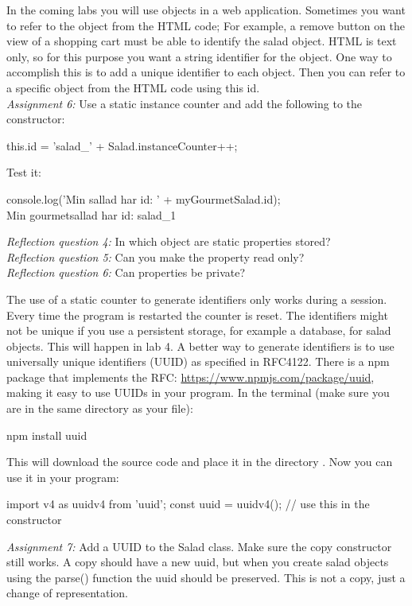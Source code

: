 \documentclass[fleqn, article, a4paper]{memoir}
\begin{document}
\begin{Assignments}
\item In the coming labs you will use  objects in a web application. Sometimes you want to refer to the object from the HTML code; For example, a remove button on the view of a shopping cart must be able to identify the salad object. HTML is text only, so for this purpose you want a string identifier for the object. One way to accomplish this is to add a unique identifier to each  object. Then you can refer to a specific object from the HTML code using this id.
\\\emph{Assignment 6:}
Use a static instance counter and add the following to the  constructor:
\begin{Code}
this.id = 'salad_' + Salad.instanceCounter++;
\end{Code}
Test it:
\begin{Code}
console.log('Min sallad har id: ' + myGourmetSalad.id);
\\ Min gourmetsallad har id: salad_1
\end{Code}
\emph{Reflection question 4:} In which object are static properties stored?
\\\emph{Reflection question 5:} Can you make the  property read only?
\\\emph{Reflection question 6:} Can properties be private?

\item
The use of a static counter to generate identifiers only works during a session. Every time the program is restarted the counter is reset. The identifiers might not be unique if you use a persistent storage, for example a database, for salad objects. This will happen in lab 4. A better way to generate identifiers is to use universally unique identifiers (UUID) as specified in RFC4122. There is a npm package that implements the RFC: \url{https://www.npmjs.com/package/uuid}, making it easy to use UUIDs in your program. In the terminal (make sure you are in the same directory as your  file):
\begin{Code}
   npm install uuid
\end{Code}
This will download the source code and place it in the directory . Now you can use it in your program:
\begin{Code}
  import { v4 as uuidv4 } from 'uuid';
  const uuid = uuidv4();  // use this in the constructor
\end{Code}
\emph{Assignment 7:} Add a UUID to the Salad class. Make sure the copy constructor still works. A copy should have a new uuid, but when you create salad objects using the parse() function the uuid should be preserved. This is not a copy, just a change of representation.


\end{Assignments}
\end{document}
